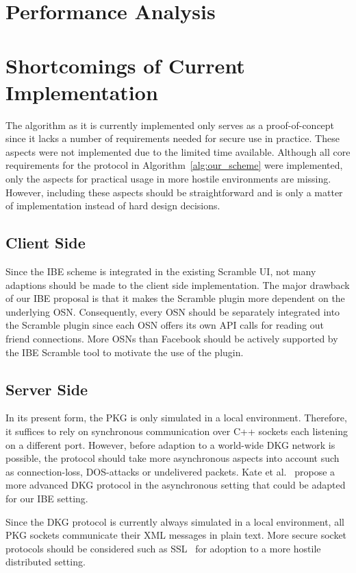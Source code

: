 \section{Performance Analysis}

\section{Shortcomings of Current Implementation}
The algorithm as it is currently implemented only serves as a proof-of-concept since it lacks a number of requirements needed for secure use in practice. These aspects were not implemented due to the limited time available. Although all core requirements for the protocol in Algorithm~\ref{alg:our_scheme} were implemented, only the aspects for practical usage in more hostile environments are missing. However, including these aspects should be straightforward and is only a matter of implementation instead of hard design decisions.

\subsection{Client Side}
Since the IBE scheme is integrated in the existing Scramble UI, not many adaptions should be made to the client side implementation. The major drawback of our IBE proposal is that it makes the Scramble plugin more dependent on the underlying OSN. Consequently, every OSN should be separately integrated into the Scramble plugin since each OSN offers its own API calls for reading out friend connections. More OSNs than Facebook should be actively supported by the IBE Scramble tool to motivate the use of the plugin.

\subsection{Server Side}
In its present form, the PKG is only simulated in a local environment. Therefore, it suffices to rely on synchronous communication over C++ sockets each listening on a different port. However, before adaption to a world-wide DKG network is possible, the protocol should take more asynchronous aspects into account such as connection-loss, DOS-attacks or undelivered packets. Kate et al.~\cite{art:KateHG12} propose a more advanced DKG protocol in the asynchronous setting that could be adapted for our IBE setting.

Since the DKG protocol is currently always simulated in a local environment, all PKG sockets communicate their XML messages in plain text. More secure socket protocols should be considered such as SSL~\cite{rfc6101} for adoption to a more hostile distributed setting.

